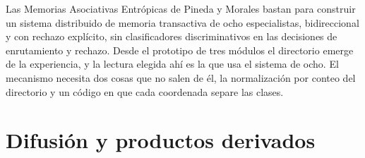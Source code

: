 \bigskip

Las Memorias Asociativas Entrópicas de Pineda y Morales bastan para construir un sistema
distribuido de memoria transactiva de ocho especialistas, bidireccional y con rechazo
explícito, sin clasificadores discriminativos en las decisiones de enrutamiento y
rechazo.
Desde el prototipo de tres módulos el directorio emerge de la experiencia, y la lectura elegida ahí
es la que usa el sistema de ocho.
El mecanismo necesita dos cosas que no salen de él, la normalización por conteo del
directorio y un código en que cada coordenada separe las clases.

\section{Difusión y productos derivados}

